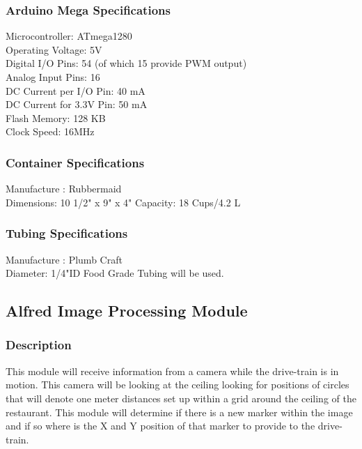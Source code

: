 \documentclass [10pt]{article}
\begin{document}
\subsubsection{Arduino Mega Specifications} 
Microcontroller:	ATmega1280\\
Operating Voltage:	5V\\
Digital I/O Pins: 54 (of which 15 provide PWM output)\\
Analog Input Pins: 16\\
DC Current per I/O Pin: 40 mA\\
DC Current for 3.3V Pin: 50 mA\\
Flash Memory: 128 KB\\
Clock Speed: 16MHz\\


\subsubsection{Container Specifications} 

Manufacture : Rubbermaid \\
Dimensions: 10 1/2" x 9" x 4" 
Capacity: 18 Cups/4.2 L\\


\subsubsection{Tubing Specifications}
Manufacture : Plumb Craft \\
Diameter: 1/4"ID Food Grade Tubing will be used.\\



\subsection{Alfred Image Processing Module }


\subsubsection{Description}
This module will receive information from a camera while the drive-train is in motion. This camera will be looking at the ceiling looking for positions of circles that will denote one meter distances set up within a grid around the ceiling of the restaurant. This module will determine if there is a new marker within the image and if so where is the X and Y position of that marker to provide to the drive-train.
\end{document}
